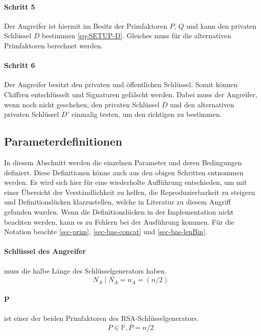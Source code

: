             \paragraph{Schritt 5} \label{sec-Schritt-Ang 5} Der Angreifer ist hiermit im Besitz der Primfaktoren $P$, $Q$ und kann den privaten Schlüssel $D$ bestimmen \eqref{eq-SETUP-D}. Gleiches muss für die alternativen Primfaktoren berechnet werden.

            \paragraph{Schritt 6} \label{sec-Schritt-Ang 6} Der Angreifer besitzt den privaten und öffentlichen Schlüssel. Somit können Chiffren entschlüsselt und Signaturen gefälscht werden. Dabei muss der Angreifer, wenn noch nicht geschehen, den privaten Schlüssel $D$ und den alternativen privaten Schlüssel $D'$ einmalig testen, um den richtigen zu bestimmen.
        
        \subsection{Parameterdefinitionen} \label{Parameterdefinitionen}
            In diesem Abschnitt werden die einzelnen Parameter und deren Bedingungen definiert. Diese Definitionen könne auch aus den obigen Schritten entnommen werden. Es wird sich hier für eine wiederholte Aufführung entschieden, um mit einer Übersicht der Verständlichkeit zu helfen, die Reproduzierbarkeit zu steigern und Definitionslücken klarzustellen, welche in Literatur zu diesem Angriff gefunden wurden. Wenn die Definitionslücken in der Implementation nicht beachten werden, kann es zu Fehlern bei der Ausführung kommen. Für die Notation beachte \ref{sec-prim}, \ref{sec-bas-concat} und \ref{sec-bas-lenBin}.

            \paragraph{Schlüssel des Angreifer} muss die halbe Länge des Schlüsselgenerators haben.
                \begin{equation}
                    N_{A} \mid \overline{N_{A}} = n_{A} = (n/2)
                \end{equation}

            \paragraph{P} ist einer der beiden Primfaktoren des \ac{RSA}-Schlüsselgenerators. 
                \begin{equation}
                    P \in \mathbb{P}, \overline{P} = n/2
                \end{equation}
            
